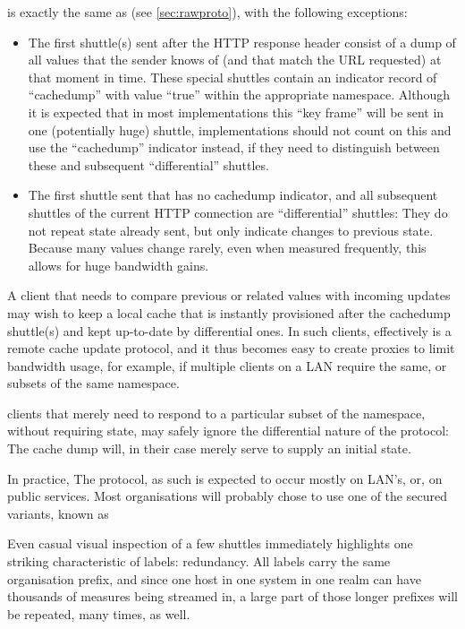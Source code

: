 \diffproto{} is exactly the same as \rawproto{} (see \ref{sec:rawproto}),
with the following exceptions:

\begin{itemize}

\item The first shuttle(s) sent after the HTTP response header consist
of a dump of all values that the sender knows of (and that match
the URL requested) at that moment in time. These special shuttles
contain an indicator record of ``cachedump'' with value ``true''
within the appropriate namespace. Although it is expected that in most
implementations this ``key frame'' will be sent in one (potentially
huge) shuttle, implementations should not count on this and use the
``cachedump'' indicator instead, if they need to distinguish between
these and subsequent ``differential'' shuttles.

\item The first shuttle sent that has no cachedump indicator, and all
subsequent shuttles of the current HTTP connection are ``differential''
shuttles: They do not repeat state already sent, but only indicate changes
to previous state.  Because many values change rarely, even when measured
frequently, this allows for huge bandwidth gains.

\end{itemize}

A \diffproto{} client that needs to compare previous or related values
with incoming updates may wish to keep a local cache that is instantly
provisioned after the cachedump shuttle(s) and kept up-to-date by
differential ones.  In such clients, \diffproto{} effectively is a remote
cache update protocol, and it thus becomes easy to create \diffproto{}
proxies to limit bandwidth usage, for example, if multiple clients on
a LAN require the same, or subsets of the same namespace.

\diffproto{} clients that merely need to respond to a particular subset of
the namespace, without requiring state, may safely ignore the differential
nature of the protocol: The cache dump will, in their case merely serve
to supply an initial state.

In practice, The \diffproto{} protocol, as such is expected to occur
mostly on LAN's, or, on public services. Most organisations will probably
chose to use one of the secured variants, known as \secproto{}

\label{sec:compproto}

Even casual visual inspection of a few \rawproto{} shuttles immediately
highlights one striking characteristic of \rawproto{} labels: redundancy.
All labels carry the same organisation prefix, and since one host in one
system in one realm can have thousands of measures being streamed in, a
large part of those longer prefixes will be repeated, many times, as well.

